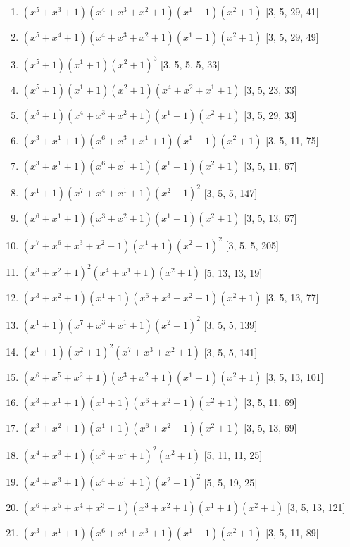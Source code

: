\documentclass[10pt,twocolumn]{article}
\begin{document}
\begin{enumerate}
\item $(x^{5} + x^{3} + 1)(x^{4} + x^{3} + x^{2} + 1)(x^{1} + 1)(x^{2} + 1)$  [3, 5, 29, 41]
\item $(x^{5} + x^{4} + 1)(x^{4} + x^{3} + x^{2} + 1)(x^{1} + 1)(x^{2} + 1)$  [3, 5, 29, 49]
\item $(x^{5} + 1)(x^{1} + 1)(x^{2} + 1)^{3}$  [3, 5, 5, 5, 33]
\item $(x^{5} + 1)(x^{1} + 1)(x^{2} + 1)(x^{4} + x^{2} + x^{1} + 1)$  [3, 5, 23, 33]
\item $(x^{5} + 1)(x^{4} + x^{3} + x^{2} + 1)(x^{1} + 1)(x^{2} + 1)$  [3, 5, 29, 33]
\item $(x^{3} + x^{1} + 1)(x^{6} + x^{3} + x^{1} + 1)(x^{1} + 1)(x^{2} + 1)$  [3, 5, 11, 75]
\item $(x^{3} + x^{1} + 1)(x^{6} + x^{1} + 1)(x^{1} + 1)(x^{2} + 1)$  [3, 5, 11, 67]
\item $(x^{1} + 1)(x^{7} + x^{4} + x^{1} + 1)(x^{2} + 1)^{2}$  [3, 5, 5, 147]
\item $(x^{6} + x^{1} + 1)(x^{3} + x^{2} + 1)(x^{1} + 1)(x^{2} + 1)$  [3, 5, 13, 67]
\item $(x^{7} + x^{6} + x^{3} + x^{2} + 1)(x^{1} + 1)(x^{2} + 1)^{2}$  [3, 5, 5, 205]
\item $(x^{3} + x^{2} + 1)^{2}(x^{4} + x^{1} + 1)(x^{2} + 1)$  [5, 13, 13, 19]
\item $(x^{3} + x^{2} + 1)(x^{1} + 1)(x^{6} + x^{3} + x^{2} + 1)(x^{2} + 1)$  [3, 5, 13, 77]
\item $(x^{1} + 1)(x^{7} + x^{3} + x^{1} + 1)(x^{2} + 1)^{2}$  [3, 5, 5, 139]
\item $(x^{1} + 1)(x^{2} + 1)^{2}(x^{7} + x^{3} + x^{2} + 1)$  [3, 5, 5, 141]
\item $(x^{6} + x^{5} + x^{2} + 1)(x^{3} + x^{2} + 1)(x^{1} + 1)(x^{2} + 1)$  [3, 5, 13, 101]
\item $(x^{3} + x^{1} + 1)(x^{1} + 1)(x^{6} + x^{2} + 1)(x^{2} + 1)$  [3, 5, 11, 69]
\item $(x^{3} + x^{2} + 1)(x^{1} + 1)(x^{6} + x^{2} + 1)(x^{2} + 1)$  [3, 5, 13, 69]
\item $(x^{4} + x^{3} + 1)(x^{3} + x^{1} + 1)^{2}(x^{2} + 1)$  [5, 11, 11, 25]
\item $(x^{4} + x^{3} + 1)(x^{4} + x^{1} + 1)(x^{2} + 1)^{2}$  [5, 5, 19, 25]
\item $(x^{6} + x^{5} + x^{4} + x^{3} + 1)(x^{3} + x^{2} + 1)(x^{1} + 1)(x^{2} + 1)$  [3, 5, 13, 121]
\item $(x^{3} + x^{1} + 1)(x^{6} + x^{4} + x^{3} + 1)(x^{1} + 1)(x^{2} + 1)$  [3, 5, 11, 89]

\end{enumerate}
\end{document}
